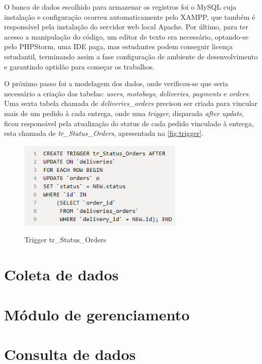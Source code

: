O banco de dados escolhido para armazenar os registros foi o MySQL cuja instalação e configuração ocorreu automaticamente pelo XAMPP, que também é responsável pela instalação do servidor web local Apache. Por último, para ter acesso a manipulação do código, um editor de texto era necessário, optando-se pelo PHPStorm, uma IDE paga, mas estudantes podem conseguir licença estudantil, terminando assim a fase configuração de ambiente de desenvolvimento e garantindo aptidão para começar os trabalhos.

O próximo passo foi a modelagem dos dados, onde verificou-se que seria necessário a criação das tabelas: \textit{users}, \textit{motoboys}, \textit{deliveries}, \textit{payments} e \textit{orders}. Uma sexta tabela chamada de \textit{deliveries\_orders} precisou ser criada para vincular mais de um pedido à cada entrega, onde uma \textit{trigger}, disparada \textit{after update}, ficou responsável pela atualização do status de cada pedido vinculado à entrega, esta chamada de \textit{tr\_Status\_Orders}, apresentada na \autoref{fig:trigger}.

\begin{figure}[H]
    \centering
    \caption{Trigger tr\_Status\_Orders}
    \includegraphics[width=0.7\textwidth]{./dados/figuras/fig7}
    \label{fig:trigger}
\end{figure}

\section{Coleta de dados}


\section{Módulo de gerenciamento}


\section{Consulta de dados}


